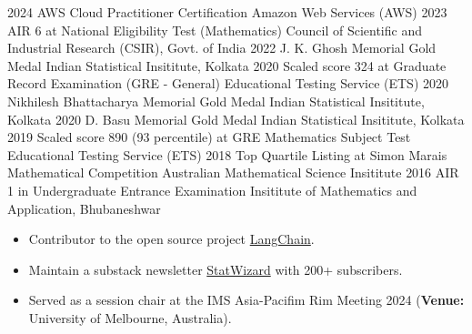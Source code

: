 \documentclass[9pt]{developercv} %
\begin{document}
\vspace*{0.2cm}

\begin{entrylist}
    \vspace*{-0.5cm}
    \entry
    {2024}
    {AWS Cloud Practitioner Certification}
    {Amazon Web Services (AWS)}
    {}
    \vspace*{-0.5cm}
    \entry
    {2023}
    {AIR 6 at National Eligibility Test (Mathematics)}
    {Council of Scientific and Industrial Research (CSIR), Govt. of India}
    {}
    \vspace*{-0.5cm}
    \entry
    {2022}
    {J. K. Ghosh Memorial Gold Medal}
    {Indian Statistical Insititute, Kolkata}
    {}
    \vspace*{-0.5cm}
    \entry
    {2020}
    {Scaled score 324 at Graduate Record Examination (GRE - General)}
    {Educational Testing Service (ETS)}
    {}
    \vspace*{-0.5cm}
    \entry
    {2020}
    {Nikhilesh Bhattacharya Memorial Gold Medal}
    {Indian Statistical Insititute, Kolkata}
    {}
    \vspace*{-0.5cm}
    \entry
    {2020}
    {D. Basu Memorial Gold Medal}
    {Indian Statistical Insititute, Kolkata}
    {}
    \vspace*{-0.5cm}
    \entry
    {2019}
    {Scaled score 890 (93 percentile) at GRE Mathematics Subject Test}
    {Educational Testing Service (ETS)}
    {}
    \vspace*{-0.5cm}
    \entry
    {2018}
    {Top Quartile Listing at Simon Marais Mathematical Competition}
    {Australian Mathematical Science Insititute}
    {}
    \vspace*{-0.5cm}
    \entry
    {2016}
    {AIR 1 in Undergraduate Entrance Examination}
    {Insititute of Mathematics and Application, Bhubaneshwar}
    {}
\end{entrylist}

\vspace{-6 pt}
\vspace{-6pt}
\begin{itemize}
    \item Contributor to the open source project \href{https://github.com/langchain-ai/langchain}{LangChain}.
    \item Maintain a substack newsletter \href{https://statwizard.substack.com/?showWelcome=true}{StatWizard} with 200+ subscribers.
    \item Served as a session chair at the IMS Asia-Pacifim Rim Meeting 2024 (\textbf{Venue:} University of Melbourne, Australia).
\end{itemize}
\end{document}
